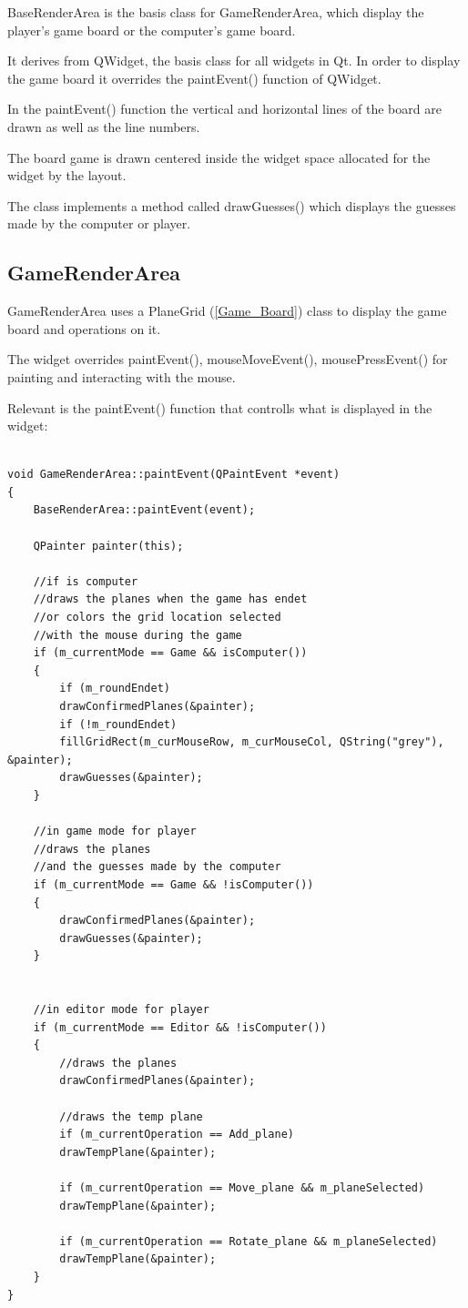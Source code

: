 BaseRenderArea is the basis class for GameRenderArea, which display the player's game board or the computer's game board. 

It derives from QWidget, the basis class for all widgets in Qt. In order to display the game board it overrides the paintEvent() function of QWidget. 

In the paintEvent() function the vertical and horizontal lines of the board are drawn as well as the line numbers.

The board game is drawn centered inside the widget space allocated for the widget by the layout.

The class implements a method called drawGuesses() which displays the guesses made by the computer or player.

\subsection{GameRenderArea}

GameRenderArea uses a PlaneGrid (\ref{Game_Board}) class to display the game board and operations on it.

The widget overrides paintEvent(), mouseMoveEvent(), mousePressEvent() for painting and interacting with the mouse.

Relevant is the paintEvent() function that controlls what is displayed in the widget:

\begin{lstlisting}

void GameRenderArea::paintEvent(QPaintEvent *event)
{
	BaseRenderArea::paintEvent(event);
	
	QPainter painter(this);
	
	//if is computer
	//draws the planes when the game has endet
	//or colors the grid location selected
	//with the mouse during the game
	if (m_currentMode == Game && isComputer())
	{
		if (m_roundEndet)
		drawConfirmedPlanes(&painter);
		if (!m_roundEndet)
		fillGridRect(m_curMouseRow, m_curMouseCol, QString("grey"), &painter);
		drawGuesses(&painter);
	}
	
	//in game mode for player
	//draws the planes
	//and the guesses made by the computer
	if (m_currentMode == Game && !isComputer())
	{
		drawConfirmedPlanes(&painter);
		drawGuesses(&painter);
	}
	
	
	//in editor mode for player    
	if (m_currentMode == Editor && !isComputer())
	{
		//draws the planes
		drawConfirmedPlanes(&painter);
		
		//draws the temp plane
		if (m_currentOperation == Add_plane)
		drawTempPlane(&painter);
		
		if (m_currentOperation == Move_plane && m_planeSelected)
		drawTempPlane(&painter);
		
		if (m_currentOperation == Rotate_plane && m_planeSelected)
		drawTempPlane(&painter);
	}
}

\end{lstlisting}

